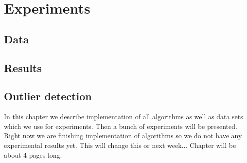 \chapter{Experiments} \label{chapterexperiments}

\section{Data}
\section{Results}
\section{Outlier detection}













In this chapter we describe implementation of all algorithms as well as data sets which we use for experiments. Then a bunch of experiments will be presented.
Right now we are finishing implementation of algorithms so we do not have any experimental results yet.
This will change this or next week...
Chapter will be about 4 pages long.